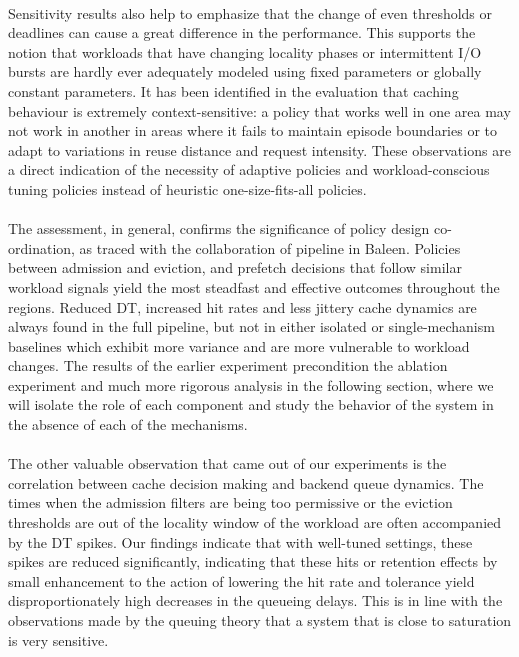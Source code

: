 \documentclass[sigconf]{acmart}
\begin{document}
{\\Sensitivity results also help to emphasize that the change of even thresholds or deadlines can cause a great difference in the performance. This supports the notion that workloads that have changing locality phases or intermittent I/O bursts are hardly ever adequately modeled using fixed parameters or globally constant parameters. It has been identified in the evaluation that caching behaviour is extremely context-sensitive: a policy that works well in one area may not work in another in areas where it fails to maintain episode boundaries or to adapt to variations in reuse distance and request intensity. These observations are a direct indication of the necessity of adaptive policies and workload-conscious tuning policies instead of heuristic one-size-fits-all policies.\\
\\The assessment, in general, confirms the significance of policy design co-ordination, as traced with the collaboration of pipeline in Baleen. Policies between admission and eviction, and prefetch decisions that follow similar workload signals yield the most steadfast and effective outcomes throughout the regions. Reduced DT, increased hit rates and less jittery cache dynamics are always found in the full pipeline, but not in either isolated or single-mechanism baselines which exhibit more variance and are more vulnerable to workload changes. The results of the earlier experiment precondition the ablation experiment and much more rigorous analysis in the following section, where we will isolate the role of each component and study the behavior of the system in the absence of each of the mechanisms.\\
\\The other valuable observation that came out of our experiments is the correlation between cache decision making and backend queue dynamics. The times when the admission filters are being too permissive or the eviction thresholds are out of the locality window of the workload are often accompanied by the DT spikes. Our findings indicate that with well-tuned settings, these spikes are reduced significantly, indicating that these hits or retention effects by small enhancement to the action of lowering the hit rate and tolerance yield disproportionately high decreases in the queueing delays. This is in line with the observations made by the queuing theory that a system that is close to saturation is very sensitive.\\
}
\end{document}
